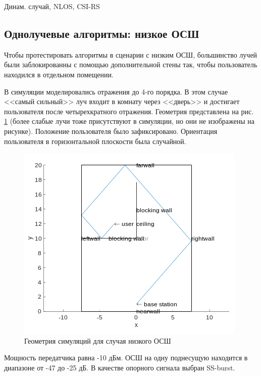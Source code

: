 \begin{table}[h!]
  \begin{center}
    \caption{Динам. случай, NLOS, CSI-RS}
    \small
    \label{tab:singlepath:rotation:NLOS-2}
  \end{center}
\end{table}

\subsection{Однолучевые алгоритмы: низкое ОСШ}
\label{sec:singlepath:static:LOW-SNR}
Чтобы протестировать алгоритмы в сценарии с низким ОСШ, 
большинство лучей были заблокированны с помощью дополнительной стены так, чтобы
пользователь находился в отдельном помещении. 

В симуляции моделировались отражения до 4-го порядка.
В этом случае <<самый сильный>> луч входит в комнату
через <<дверь>> и достигает пользователя после четырехкратного отражения. Геометрия
представлена на рис. \ref{fig:4.36} (более слабые лучи тоже присутствуют в
симуляции, но они не изображены на рисунке).
Положение пользователя было зафиксировано. Ориентация пользователя в горизонтальной плоскости была
случайной.

\begin{figure}[ht]
  \centering
  \includegraphics[width=.5\linewidth]{figs/fig4.36}
  \caption{Геометрия симуляций для случая низкого ОСШ}
  \label{fig:4.36}
\end{figure}

Мощность передатчика равна -10 дБм. ОСШ на одну поднесущую находится в диапазоне
от -47 до -25 дБ. В качестве опорного сигнала выбран SS-burst. 

